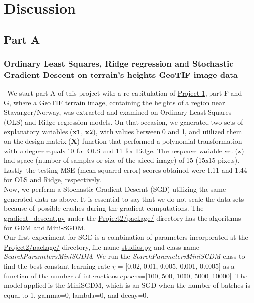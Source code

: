 \section{Discussion}
\label{chap:Discussion}

\subsection{Part A}
\label{chap:PartA}

\subsubsection{Ordinary Least Squares, Ridge regression and Stochastic Gradient Descent on terrain's heights GeoTIF image-data}
\label{chap:Ordinary Least Squares, Ridge regression and Stochastic Gradient Descent on terrain's heights GeoTIF image-data}

\qquad \, We start part A of this project with a re-capitulation of \href{https://github.com/fabiorodp/UiO-FYS-STK4155/blob/master/Project1}{Project 1}, part F and G, where a GeoTIF terrain image, containing the heights of a region near Stavanger/Norway, was extracted and examined on Ordinary Least Squares (OLS) and Ridge regression models. On that occasion, we generated two sets of explanatory variables ($\boldsymbol{x1}$, $\boldsymbol{x2}$), with values between 0 and 1, and utilized them on the design matrix ($\boldsymbol{X}$) function that performed a polynomial transformation with a degree equals 10 for OLS and 11 for Ridge. The response variable set ($\boldsymbol{z}$) had space (number of samples or size of the sliced image) of 15 (15x15 pixels). Lastly, the testing MSE (mean squared error) scores obtained were 1.11 and 1.44 for OLS and Ridge, respectively.\\

Now, we perform a Stochastic Gradient Descent (SGD) utilizing the same generated data as above. It is essential to say that we do not scale the data-sets because of possible crashes during the gradient computations. The \href{https://github.com/fabiorodp/UiO-FYS-STK4155/blob/master/Project2/package/gradient_descent.py}{gradient\_descent.py} under the \href{https://github.com/fabiorodp/UiO-FYS-STK4155/tree/master/Project2/package}{Project2/package/} directory has the algorithms for GDM and Mini-SGDM.\\

Our first experiment for SGD is a combination of parameters incorporated at the \href{https://github.com/fabiorodp/UiO-FYS-STK4155/tree/master/Project2/package}{Project2/package/} directory, file name \href{https://github.com/fabiorodp/UiO-FYS-STK4155/blob/master/Project2/package/studies.py}{studies.py} and class name \textit{SearchParametersMiniSGDM}. We run the \textit{SearchParametersMiniSGDM} class to find the best constant learning rate $\eta$ = [0.02, 0.01, 0.005, 0.001, 0.0005] as a function of the number of interactions epochs=[100, 500, 1000, 5000, 10000]. The model applied is the MiniSGDM, which is an SGD when the number of batches is equal to 1, gamma=0, lambda=0, and decay=0.\\

